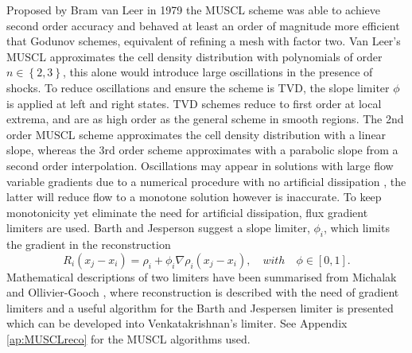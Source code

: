 	Proposed by Bram van Leer in 1979 \cite{vanLeer79} the MUSCL scheme was able to achieve second order accuracy and behaved at least an order of magnitude more efficient that Godunov schemes, equivalent of refining a mesh with factor two. Van Leer's MUSCL approximates the cell density distribution with polynomials of order $n\in\left\{2,3\right\}$, this alone would introduce large oscillations in the presence of shocks. To reduce oscillations and ensure the scheme is TVD, the slope limiter $\phi$ is applied at left and right states. TVD schemes reduce to first order at local extrema, and are as high order as the general scheme in smooth regions. The 2nd order MUSCL scheme approximates the cell density distribution with a linear slope, whereas the 3rd order scheme approximates with a parabolic slope from a second order interpolation. Oscillations may appear in solutions with large flow variable gradients due to a numerical procedure with no artificial dissipation \cite{Tu18}, the latter will reduce flow to a monotone solution however is inaccurate. To keep monotonicity yet eliminate the need for artificial dissipation, flux gradient limiters are used. Barth and Jesperson \cite{Barth89} suggest a slope limiter, $\phi_i$, which limits the gradient in the reconstruction
	\begin{equation}
		R_i\left(x_j-x_i\right)=\rho_i+\phi_i\nabla \rho_i\left(x_j-x_i\right), \quad with \quad \phi\in[0,1]. \nonumber
	\end{equation}
	Mathematical descriptions of two limiters have been summarised from Michalak and Ollivier-Gooch \cite{Gooch08}, where reconstruction is described with the need of gradient limiters and a useful algorithm for the Barth and Jespersen limiter is presented which can be developed into Venkatakrishnan's limiter. See Appendix \ref{ap:MUSCLreco} for the MUSCL algorithms used. 

